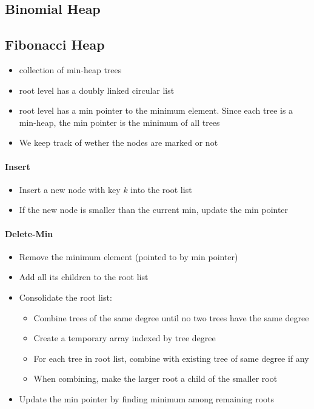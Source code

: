 \subsection{Binomial Heap}



\subsection{Fibonacci Heap}
\begin{itemize}
    \item collection of min-heap trees
    \item root level has a doubly linked circular list
    \item root level has a min pointer to the minimum element. Since each tree is a min-heap, the min pointer is the minimum of all trees
    \item We keep track of wether the nodes are marked or not
\end{itemize}

\paragraph{Insert}
\begin{itemize}
    \item Insert a new node with key \( k \) into the root list
    \item If the new node is smaller than the current min, update the min pointer
\end{itemize}

\paragraph{Delete-Min}
\begin{itemize}
    \item Remove the minimum element (pointed to by min pointer)
    \item Add all its children to the root list
    \item Consolidate the root list:
        \begin{itemize}
            \item Combine trees of the same degree until no two trees have the same degree
            \item Create a temporary array indexed by tree degree
            \item For each tree in root list, combine with existing tree of same degree if any
            \item When combining, make the larger root a child of the smaller root
        \end{itemize}
    \item Update the min pointer by finding minimum among remaining roots
\end{itemize}

